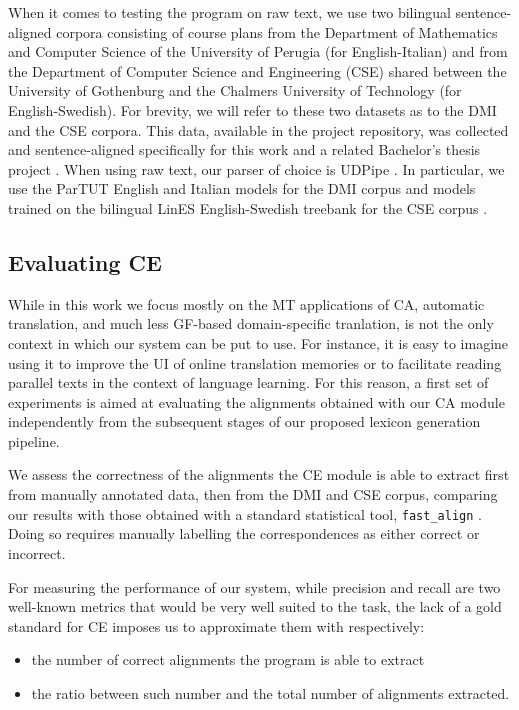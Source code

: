 \documentclass[11pt]{article}
\begin{document}
When it comes to testing the program on raw text, we use two bilingual sentence-aligned corpora consisting of course plans from the Department of Mathematics and Computer Science of the University of Perugia (for English-Italian) and from the Department of Computer Science and Engineering (CSE) shared between the University of Gothenburg and the Chalmers University of Technology (for English-Swedish). For brevity, we will refer to these two datasets as to the DMI and the CSE corpora.
This data, available in the project repository, was collected and sentence-aligned specifically for this work and a related Bachelor's thesis project \cite{TODO:}.
When using raw text, our parser of choice is UDPipe \cite{TODO:}. 
In particular, we use the ParTUT English and Italian models for the DMI corpus and models trained on the bilingual LinES English-Swedish treebank for the CSE corpus \cite{TODO:}.

\subsection{Evaluating CE} %
While in this work we focus mostly on the MT applications of CA, automatic translation, and much less GF-based domain-specific tranlation, is not the only context in which our system can be put to use. 
For instance, it is easy to imagine using it to improve the UI of online translation memories or to facilitate reading parallel texts in the context of language learning.
For this reason, a first set of experiments is aimed at evaluating the alignments obtained with our CA module independently from the subsequent stages of our proposed lexicon generation pipeline.

We assess the correctness of the alignments the CE module is able to extract first from manually annotated data, then from the DMI and CSE corpus, comparing our results with those obtained with a standard statistical tool, \texttt{fast\_align} \cite{TODO:}.
Doing so requires manually labelling the correspondences as either correct or incorrect. 

For measuring the performance of our system, while precision and recall are two well-known metrics that would be very well suited to the task, the lack of a gold standard for CE imposes us to approximate them with respectively:

\begin{itemize}
  \item the number of correct alignments the program is able to extract
  \item the ratio between such number and the total number of alignments extracted.
 \end{itemize}
\end{document}
